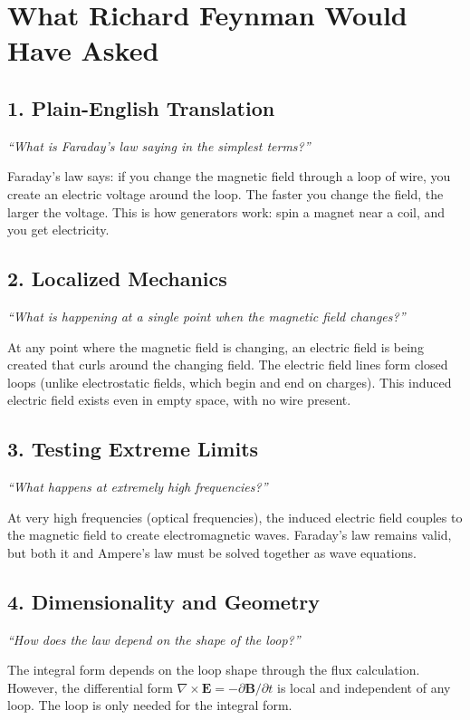 \section*{What Richard Feynman Would Have Asked}

\subsection*{1. Plain-English Translation}
\textit{``What is Faraday's law saying in the simplest terms?''}

Faraday's law says: if you change the magnetic field through a loop of wire, you create an electric voltage around the loop. The faster you change the field, the larger the voltage. This is how generators work: spin a magnet near a coil, and you get electricity.

\subsection*{2. Localized Mechanics}
\textit{``What is happening at a single point when the magnetic field changes?''}

At any point where the magnetic field is changing, an electric field is being created that curls around the changing field. The electric field lines form closed loops (unlike electrostatic fields, which begin and end on charges). This induced electric field exists even in empty space, with no wire present.

\subsection*{3. Testing Extreme Limits}
\textit{``What happens at extremely high frequencies?''}

At very high frequencies (optical frequencies), the induced electric field couples to the magnetic field to create electromagnetic waves. Faraday's law remains valid, but both it and Ampere's law must be solved together as wave equations.

\subsection*{4. Dimensionality and Geometry}
\textit{``How does the law depend on the shape of the loop?''}

The integral form depends on the loop shape through the flux calculation. However, the differential form $\nabla \times \mathbf{E} = -\partial \mathbf{B}/\partial t$ is local and independent of any loop. The loop is only needed for the integral form.

